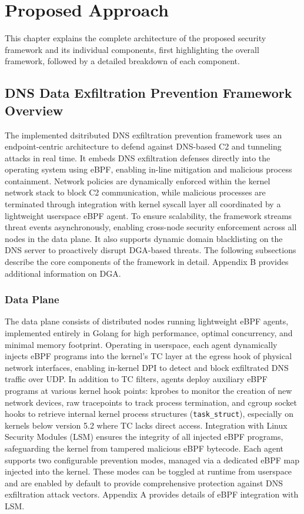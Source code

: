 \documentclass [11pt, proquest] {uwthesis}[2020/02/24]
\begin{document}
\chapter{Proposed Approach}
This chapter explains the complete architecture of the proposed security framework and its individual components, first highlighting the overall framework, followed by a detailed breakdown of each component.
\section{DNS Data Exfiltration Prevention Framework Overview}
The implemented dsitributed DNS exfiltration prevention framework uses an endpoint-centric architecture to defend against DNS-based C2 and tunneling attacks in real time. It embeds DNS exfiltration defenses directly into the operating system using eBPF, enabling in-line mitigation and malicious process containment. Network policies are dynamically enforced within the kernel network stack to block C2 communication, while malicious processes are terminated through integration with kernel syscall layer all coordinated by a lightweight userspace eBPF agent. To ensure scalability, the framework streams threat events asynchronously, enabling cross-node security enforcement across all nodes in the data plane. It also supports dynamic domain blacklisting on the DNS server to proactively disrupt DGA-based threats. The following subsections describe the core components of the framework in detail. Appendix B provides additional information on DGA.


\subsection{Data Plane}
The data plane consists of distributed nodes running lightweight eBPF agents, implemented entirely in Golang for high performance, optimal concurrency, and minimal memory footprint. Operating in userspace, each agent dynamically injects eBPF programs into the kernel’s TC layer at the egress hook of physical network interfaces, enabling in-kernel DPI to detect and block exfiltrated DNS traffic over UDP. In addition to TC filters, agents deploy auxiliary eBPF programs at various kernel hook points: kprobes to monitor the creation of new network devices, raw tracepoints to track process termination, and cgroup socket hooks to retrieve internal kernel process structures (\texttt{task\_struct}), especially on kernels below version 5.2 where TC lacks direct access. Integration with Linux Security Modules (LSM) ensures the integrity of all injected eBPF programs, safeguarding the kernel from tampered malicious eBPF bytecode. Each agent supports two configurable prevention modes, managed via a dedicated eBPF map injected into the kernel. These modes can be toggled at runtime from userspace and are enabled by default to provide comprehensive protection against DNS exfiltration attack vectors. Appendix A provides details of eBPF integration with LSM.
\end{document}
